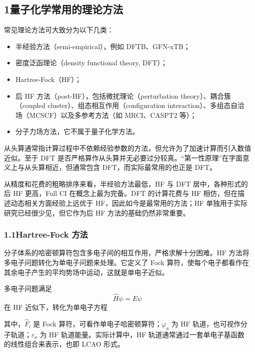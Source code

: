 \subsection*{1\quad 量子化学常用的理论方法}

常见理论方法可大致分为以下几类：
\begin{itemize}
  \item 半经验方法（semi-empirical），例如 DFTB、GFN-xTB；
  \item 密度泛函理论（density functional theory, DFT）；
  \item Hartree-Fock（HF）；
  \item 后 HF 方法（post-HF），包括微扰理论（perturbation theory）、耦合簇（coupled cluster）、组态相互作用（configuration interaction）、多组态自洽场（MCSCF）以及多参考方法（如 MRCI、CASPT2 等）；
  \item 分子力场方法，它不属于量子化学方法。
\end{itemize}

从头算通常指计算过程中不依赖经验参数的方法，但允许为了加速计算而引入数值近似。至于 DFT 是否严格算作从头算并无必要过分较真。“第一性原理”在字面意义上与从头算相近，但通常包含 DFT，而实际最常用的也正是 DFT。

从精度和花费的粗略排序来看，半经验方法最低，HF 与 DFT 居中，各种形式的后 HF 更高，Full CI 在概念上最为完备。DFT 的计算花费与 HF 相仿，但在描述动态相关方面经验上远优于 HF，因此如今是最常用的方法；HF 单独用于实际研究已经很少见，但它作为后 HF 方法的基础仍然非常重要。

\subsubsection*{1.1\quad Hartree-Fock 方法}

分子体系的哈密顿算符包含多电子间的相互作用，严格求解十分困难。HF 方法将多电子问题转化为单电子问题来处理。它定义了 Fock 算符，使每个电子都看作在其余电子产生的平均势场中运动，这就是单电子近似。

多电子问题满足
\[
\hat H\psi=E\psi
\]
在 HF 近似下，转化为单电子方程
\begin{center}
\setlength{\fboxsep}{10pt}
\end{center}

其中，$\hat F_i$ 是 Fock 算符，可看作单电子哈密顿算符；$\varphi_a$ 为 HF 轨道，也可视作分子轨道；$\varepsilon_a$ 为 HF 轨道能量。实际计算中，HF 轨道通常通过一套单电子基函数的线性组合来表示，也即 LCAO 形式。

